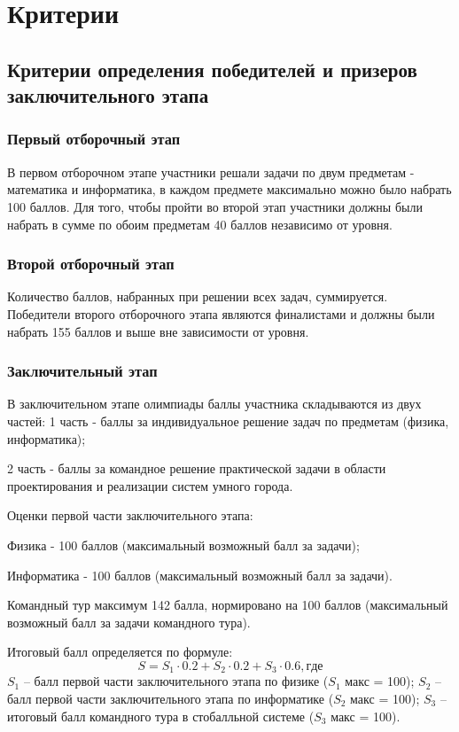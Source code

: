 \part{Критерии}

\chapter{Критерии определения победителей и призеров заключительного этапа}
 
\section{Первый отборочный этап}

В первом отборочном этапе участники решали задачи по двум предметам - математика и информатика, в каждом предмете максимально можно было набрать 100 баллов. Для того, чтобы пройти во второй этап участники должны были набрать в сумме по обоим предметам 40 баллов независимо от уровня.

\section{Второй отборочный этап}

Количество баллов, набранных при решении всех задач, суммируется. Победители второго отборочного этапа являются финалистами и должны были набрать 155 баллов и выше вне зависимости от уровня.

\section{Заключительный этап}

В заключительном этапе олимпиады баллы участника складываются из двух частей: 1 часть - баллы за индивидуальное решение задач по предметам (физика, информатика);

2 часть - баллы за командное решение практической задачи в области проектирования и реализации систем умного города.

Оценки первой части заключительного этапа:

Физика - 100 баллов (максимальный возможный балл за задачи);

Информатика - 100 баллов (максимальный возможный балл за задачи).

Командный тур максимум 142 балла, нормировано на 100 баллов (максимальный возможный балл за задачи командного тура).

Итоговый балл определяется по формуле: 
$$S = S_1 \cdot 0.2 + S_2 \cdot 0.2 + S_3 \cdot 0.6, где$$
$S_1$ – балл первой части заключительного этапа по физике ($S_1$ макс = 100);
$S_2$ – балл первой части заключительного этапа по информатике ($S_2$ макс = 100);
$S_3$ – итоговый балл командного тура в стобалльной системе ($S_3$ макс = 100).

